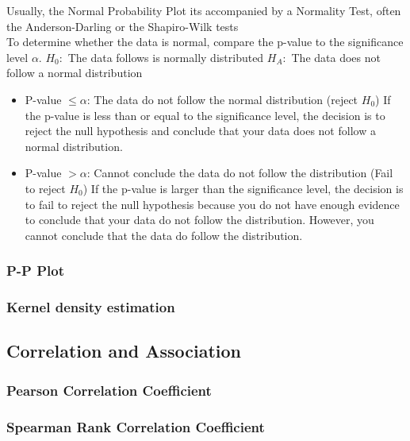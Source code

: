 \documentclass[11pt]{article}
\providecommand{\tightlist}{%
      \setlength{\itemsep}{0pt}\setlength{\parskip}{0pt}}
\begin{document}
Usually, the Normal Probability Plot its accompanied by a Normality
Test, often the Anderson-Darling or the Shapiro-Wilk tests\\
To determine whether the data is normal, compare the p-value to the
significance level \(\alpha\). \(H_0:\) The data follows is normally
distributed \(H_A:\) The data does not follow a normal distribution

\begin{itemize}
\tightlist
\item
  P-value \(\leq \alpha\): The data do not follow the normal
  distribution (reject \(H_0\)) If the p-value is less than or equal to
  the significance level, the decision is to reject the null hypothesis
  and conclude that your data does not follow a normal distribution.
\item
  P-value \(> \alpha\): Cannot conclude the data do not follow the
  distribution (Fail to reject \(H_0\)) If the p-value is larger than
  the significance level, the decision is to fail to reject the null
  hypothesis because you do not have enough evidence to conclude that
  your data do not follow the distribution. However, you cannot conclude
  that the data do follow the distribution.
\end{itemize}

\hypertarget{p-p-plot}{%
\subsubsection{P-P Plot}\label{p-p-plot}}

\hypertarget{kernel-density-estimation}{%
\subsubsection{Kernel density
estimation}\label{kernel-density-estimation}}

\hypertarget{correlation-and-association}{%
\subsection{Correlation and
Association}\label{correlation-and-association}}

\hypertarget{pearson-correlation-coefficient}{%
\subsubsection{Pearson Correlation
Coefficient}\label{pearson-correlation-coefficient}}

\hypertarget{spearman-rank-correlation-coefficient}{%
\subsubsection{Spearman Rank Correlation
Coefficient}\label{spearman-rank-correlation-coefficient}}
\end{document}
